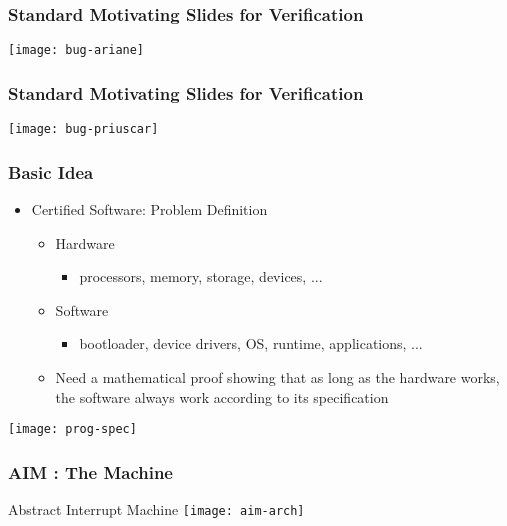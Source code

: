 \begin{frame}[plain]	
	\frametitle{Standard Motivating Slides for Verification}

	\centering
	\texttt{[image: bug-ariane]}

	
\end{frame}

\begin{frame}[plain]	
	\frametitle{Standard Motivating Slides for Verification}
	
	\centering
	\texttt{[image: bug-priuscar]}
	
	
\end{frame}
\begin{frame}[plain]	
	\frametitle{Basic Idea}
	
	\begin{itemize}\Large
		\item Certified Software: Problem Definition
		\begin{itemize}\large
			\item Hardware
			\begin{itemize}\large
				\item processors, memory, storage, devices, ...
	
			\end{itemize}
			\item Software
			\begin{itemize}\large
				\item bootloader, device drivers, OS, runtime, applications, ...
			
			\end{itemize}
			\item Need a mathematical proof showing that
			as long as the hardware works, the software
			always work according to its specification						
		\end{itemize}
	\end{itemize}
	
	\centering
\texttt{[image: prog-spec]}
	
\end{frame}

\begin{frame}[plain]	
	\frametitle{AIM : The Machine}
	\LARGE
	Abstract Interrupt Machine
	\centering
	\texttt{[image: aim-arch]}
	
	
\end{frame}

